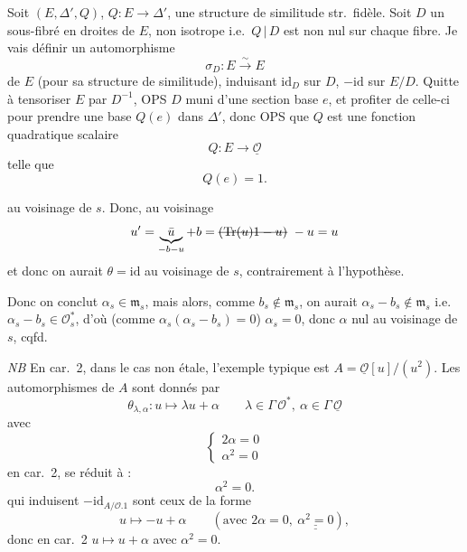 \documentclass[11pt,a4paper]{article}
\begin{document}
Soit $(E, \Delta', Q)$, $Q \colon E \to \Delta'$, une structure de similitude str.\ fidèle. Soit $D$ un sous-fibré en droites de $E$,  non isotrope i.e.\ $Q \,|\, D$ est non nul sur chaque fibre. Je vais définir un automorphisme
\[
  \sigma_D \colon E \xrightarrow{\sim} E
\]
de $E$ (pour sa structure de similitude), induisant $\mathrm{id}_D$ sur $D$, $-\mathrm{id}$ sur $E/D$. Quitte à tensoriser $E$ par $D^{-1}$, OPS $D$ muni d'une section base $e$, et profiter de celle-ci pour prendre une base $Q(e)$ dans $\Delta'$, donc OPS que $Q$ est  une fonction quadratique scalaire
\[
  Q \colon E \to \underline{\mathcal{O}}
\]
telle que
\[
  Q(e) = 1 .
\]

au voisinage de $s$. Donc, au voisinage
\[
  u' = \underbrace{\bar{u}}_{-b-u} + b = \text{\struck{$(\mathrm{Tr}(u)1 - u)$}}\ -u = u
\]
et donc on aurait $\theta = \mathrm{id}$ au voisinage de $s$, contrairement à l'hypothèse.

Donc on conclut $\alpha_s \in \mathfrak{m}_s$, mais alors, comme $b_s \notin \mathfrak{m}_s$, \struck{\ill{}} on aurait $\alpha_s - b_s \notin \mathfrak{m}_s$ i.e.\ $\alpha_s - b_s \in \mathcal{O}_s^{*}$, d'où (comme $\alpha_s(\alpha_s - b_s) = 0$) $\alpha_s = 0$, donc $\alpha$ nul au voisinage de $s$, cqfd.

\emph{NB} En car.\ 2, dans le cas non étale, l'exemple typique est $A = \underline{\mathcal{O}}[u]/(u^{2})$. Les automorphismes de $A$    sont donnés par
\[
  \theta_{\lambda, \alpha} \colon u \mapsto \lambda u + \alpha \qquad \lambda \in \Gamma\, \mathcal{O}^{*},\ \alpha \in \Gamma\, \underline{\mathcal{O}}
\]
avec
\[
  \left\{\begin{array}{l}
    2\alpha = 0 \\
    \alpha^{2} = 0
  \end{array}\right.
\]
en car.\ 2, se réduit à :
\[
  \alpha^{2} = 0 .
\]
  qui induisent $-\mathrm{id}_{A/\mathcal{O}.1}$ sont ceux de la forme
\[
  u \mapsto -u + \alpha \qquad (\text{avec } 2\alpha = 0,\ \underline{\underline{\alpha^{2} = 0}}),
\]
donc en car.\ 2  $u \mapsto u + \alpha$ avec $\alpha^{2} = 0$.
\end{document}
